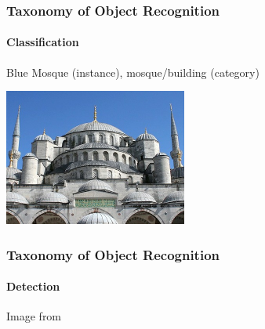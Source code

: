 \documentclass[xetex,professionalfont]{beamer}
\begin{document}

\begin{frame}
\frametitle{Taxonomy of Object Recognition}
\framesubtitle{Classification}

Blue Mosque (instance), mosque/building (category) %

\bigskip
\begin{center}
\includegraphics[width=6cm]{figures/blue-mosque.jpg}
\end{center}

\end{frame}


\begin{frame}
\frametitle{Taxonomy of Object Recognition}
\framesubtitle{Detection}

\begin{center}
    {\centering Image from \cite{prince12}}
\end{center}

\end{frame}

\end{document}
